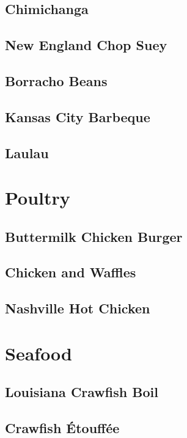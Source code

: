 \documentclass[a4paper, oneside]{book}
\begin{document}
\subsection{Chimichanga}

\subsection{New England Chop Suey}

\subsection{Borracho Beans}

\subsection{Kansas City Barbeque}

\subsection{Laulau}

\section{Poultry}

\subsection{Buttermilk Chicken Burger}

\subsection{Chicken and Waffles}

\subsection{Nashville Hot Chicken}

\section{Seafood}

\subsection{Louisiana Crawfish Boil}

\subsection{Crawfish Étouffée}
\end{document}
